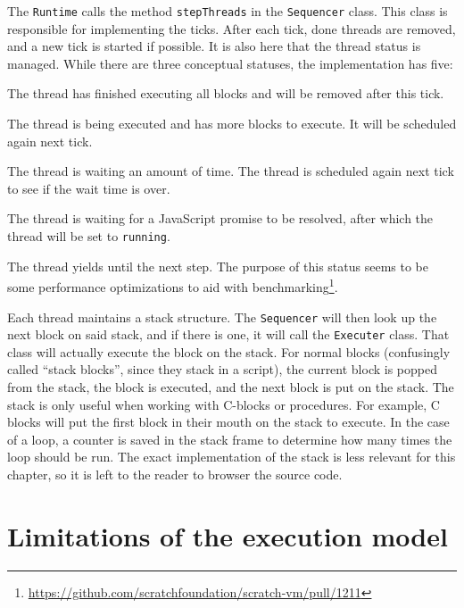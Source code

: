 \documentclass[../main]{subfiles}
\begin{document}
The \texttt{Runtime} calls the method \texttt{stepThreads} in the \texttt{Sequencer} class.
This class is responsible for implementing the ticks.
After each tick, done threads are removed, and a new tick is started if possible.
It is also here that the thread status is managed.
While there are three conceptual statuses, the implementation has five:
\begin{description}[noitemsep]
    \item[\texttt{done}] The thread has finished executing all blocks and will be removed after this tick.
    \item[\texttt{running}] The thread is being executed and has more blocks to execute.
        It will be scheduled again next tick.
    \item[\texttt{yield}] The thread is waiting an amount of time.
        The thread is scheduled again next tick to see if the wait time is over.
    \item[\texttt{promise wait}] The thread is waiting for a JavaScript promise to be resolved, after which the thread will be set to \texttt{running}.
    \item[\texttt{yield tick}] The thread yields until the next step.
        The purpose of this status seems to be some performance optimizations to aid with benchmarking\footnote{\url{https://github.com/scratchfoundation/scratch-vm/pull/1211}}.
\end{description}

Each thread maintains a stack structure.
The \texttt{Sequencer} will then look up the next block on said stack, and if there is one, it will call the \texttt{Executer} class.
That class will actually execute the block on the stack.
For normal blocks (confusingly called ``stack blocks'', since they stack in a script), the current block is popped from the stack, the block is executed, and the next block is put on the stack.
The stack is only useful when working with C-blocks or procedures.
For example, C blocks will put the first block in their mouth on the stack to execute.
In the case of a loop, a counter is saved in the stack frame to determine how many times the loop should be run.
The exact implementation of the stack is less relevant for this chapter, so it is left to the reader to browser the source code.

\section{Limitations of the execution model}\label{sec:limitations-of-the-execution-model-for-the-debugger}
\end{document}
